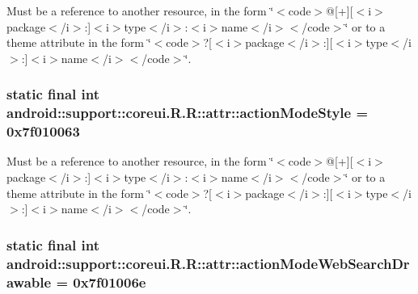 Must be a reference to another resource, in the form \char`\"{}$<$code$>$@\mbox{[}+\mbox{]}\mbox{[}$<$i$>$package$<$/i$>$:\mbox{]}$<$i$>$type$<$/i$>$:$<$i$>$name$<$/i$>$$<$/code$>$\char`\"{} or to a theme attribute in the form \char`\"{}$<$code$>$?\mbox{[}$<$i$>$package$<$/i$>$:\mbox{]}\mbox{[}$<$i$>$type$<$/i$>$:\mbox{]}$<$i$>$name$<$/i$>$$<$/code$>$\char`\"{}. \hypertarget{classandroid_1_1support_1_1coreui_1_1_r_1_1attr_0d7daeea73cb5472fb980fc096b2b779}{
\subsubsection[{actionModeStyle}]{\setlength{\rightskip}{0pt plus 5cm}static final int android::support::coreui.R.R::attr::actionModeStyle = 0x7f010063}}
\label{classandroid_1_1support_1_1coreui_1_1_r_1_1attr_0d7daeea73cb5472fb980fc096b2b779}


Must be a reference to another resource, in the form \char`\"{}$<$code$>$@\mbox{[}+\mbox{]}\mbox{[}$<$i$>$package$<$/i$>$:\mbox{]}$<$i$>$type$<$/i$>$:$<$i$>$name$<$/i$>$$<$/code$>$\char`\"{} or to a theme attribute in the form \char`\"{}$<$code$>$?\mbox{[}$<$i$>$package$<$/i$>$:\mbox{]}\mbox{[}$<$i$>$type$<$/i$>$:\mbox{]}$<$i$>$name$<$/i$>$$<$/code$>$\char`\"{}. \hypertarget{classandroid_1_1support_1_1coreui_1_1_r_1_1attr_cd3e2998db7e8e3b96c11b9005e5bbd2}{
\subsubsection[{actionModeWebSearchDrawable}]{\setlength{\rightskip}{0pt plus 5cm}static final int android::support::coreui.R.R::attr::actionModeWebSearchDrawable = 0x7f01006e}}
\label{classandroid_1_1support_1_1coreui_1_1_r_1_1attr_cd3e2998db7e8e3b96c11b9005e5bbd2}


